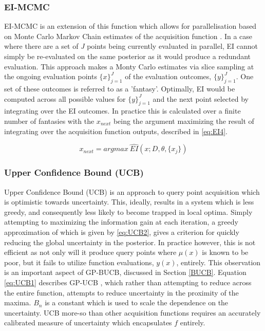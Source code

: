 \documentclass{article}
\begin{document}
			\subsubsection{EI-MCMC}\label{EI-MCMC}

			EI-MCMC is an extension of this function which allows for parallelisation based on Monte Carlo Markov Chain estimates of the acquisition function \cite{17}. In a case where there are a set of \textit{J} points being currently evaluated in parallel, EI cannot simply be re-evaluated on the same posterior as it would produce a redundant evaluation. This approach makes a Monty Carlo estimates via slice sampling at the ongoing evaluation points \({\{x\}}_{j=1}^J\) of the evaluation outcomes, \(\{y\}_{j=1}^J\). One set of these outcomes is referred to as a 'fantasy'. Optimally, EI would be computed across all possible values for \(\{y\}_{j=1}^J\) and the next point selected by integrating over the EI outcomes. In practice this is calculated over a finite number of fantasies with the \(x_{next}\) being the argument maximizing the result of integrating over the acquisition function outputs, described in \ref{eq:EI4}.

			\begin{equation}\label{eq:EI4} x_{next} = argmax~ \widehat{EI}(x; D, \theta,\{x_j\})\end{equation}


		\subsubsection{Upper Confidence Bound (UCB)}
			Upper Confidence Bound (UCB) is an approach to query point acquisition which is optimistic towards uncertainty. This, ideally, results in a system which is less greedy, and consequently less likely to become trapped in local optima. Simply attempting to maximizing the information gain at each iteration, a greedy approximation of which is given by \ref{eq:UCB2}, gives a criterion for quickly reducing the global uncertainty in the posterior. In practice however, this is not efficient as not only will it produce query points where \(\mu(x)\) is known to be poor, but it fails to utilize function evaluations, \(y(x)\), entirely. This observation is an important aspect of GP-BUCB, discussed in Section \ref{BUCB}. Equation \ref{eq:UCB1} describes GP-UCB \cite{GP-UCB}, which rather than attempting to reduce across the entire function, attempts to reduce uncertainty in the proximity of the maxima. \(B_n\) is a constant which is used to scale the dependence on the uncertainty. UCB more-so than other acquisition functions requires an accurately calibrated measure of uncertainty which encapsulates \(f\) entirely.
\end{document}
